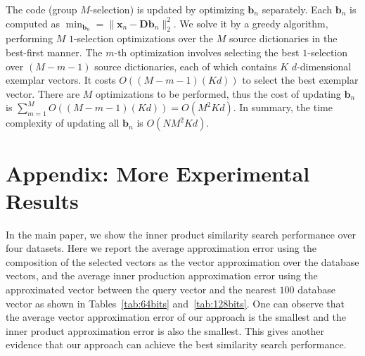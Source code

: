 \documentclass[10pt, letterpaper]{article}
\begin{document}
The code (group $M$-selection) is updated
by optimizing $\mathbf{b}_n$ separately.
Each $\mathbf{b}_n$ is computed
as $\min_{\mathbf{b}_n} = \|\mathbf{x}_n -\mathbf{D}\mathbf{b}_n\|_2^2$.
We solve it by a greedy algorithm,
performing $M$ $1$-selection optimizations over the $M$ source dictionaries
in the best-first manner.
The $m$-th optimization involves selecting the best $1$-selection over $(M-m-1)$ source dictionaries,
each of which contains $K$ $d$-dimensional exemplar vectors.
It costs $O\left((M-m-1)(Kd)\right)$ to select the best exemplar vector.
There are $M$ optimizations to be performed,
thus the cost of updating $\mathbf{b}_n$
is $\sum_{m=1}^MO\left((M-m-1)(Kd)\right)=O(M^2Kd)$.
In summary, the time complexity of updating all $\mathbf{b}_n$
is $O(NM^2Kd)$.


\section{Appendix: More Experimental Results}
In the main paper,
we show the inner product similarity search performance
over four datasets.
Here we report the average approximation error using the composition of the selected vectors as the vector approximation
over the database vectors,
and the average inner production approximation error using the approximated vector
between the query vector and the nearest $100$ database vector
as shown in Tables~\ref{tab:64bits} and~\ref{tab:128bits}.
One can observe that the average vector approximation error of our approach is the smallest
and the inner product approximation error is also the smallest.
This gives another evidence
that our approach can achieve the best similarity search performance.
\end{document}
